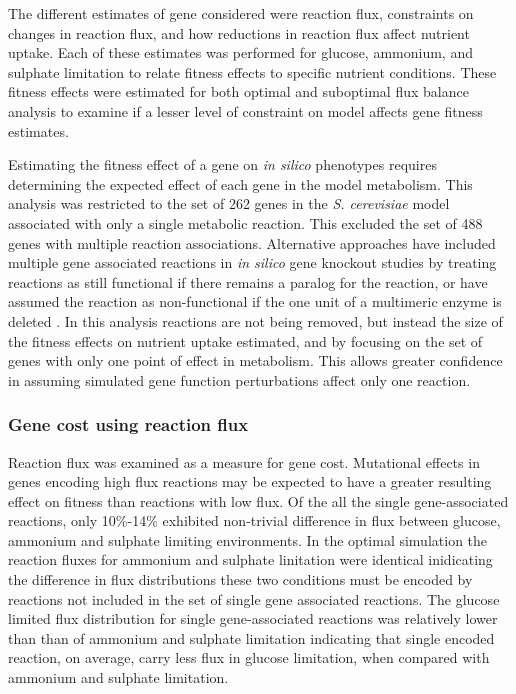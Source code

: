 The different estimates of gene considered were reaction flux, constraints on changes in reaction flux, and how reductions in reaction flux affect nutrient uptake. Each of these estimates was performed for glucose, ammonium, and sulphate limitation to relate fitness effects to specific nutrient conditions. These fitness effects were estimated for both optimal and suboptimal flux balance analysis to examine if a lesser level of constraint on model affects gene fitness estimates.

Estimating the fitness effect of a gene on \emph{in silico} phenotypes requires determining the expected effect of each gene in the model metabolism. This analysis was restricted to the set of 262 genes in the \emph{S. cerevisiae} model associated with only a single metabolic reaction. This excluded the set of 488 genes with multiple reaction associations. Alternative approaches have included multiple gene associated reactions in \emph{in silico} gene knockout studies by treating reactions as still functional if there remains a paralog for the reaction, or have assumed the reaction as non-functional if the one unit of a multimeric enzyme is deleted \cite{pal2006}. In this analysis reactions are not being removed, but instead the size of the fitness effects on nutrient uptake estimated, and by focusing on the set of genes with only one point of effect in metabolism. This allows greater confidence in assuming simulated gene function perturbations affect only one reaction.

\subsubsection{Gene cost using reaction flux}%

Reaction flux was examined as a measure for gene cost. Mutational effects in genes encoding high flux reactions may be expected to have a greater resulting effect on fitness than reactions with low flux. Of the all the single gene-associated reactions, only 10\%-14\% exhibited non-trivial difference in flux between glucose, ammonium and sulphate limiting environments. In the optimal simulation the reaction fluxes for ammonium and sulphate linitation were identical inidicating the difference in flux distributions these two conditions must be encoded by reactions not included in the set of single gene associated reactions. The glucose limited flux distribution for single gene-associated reactions was relatively lower than than of ammonium and sulphate limitation indicating that single encoded reaction, on average, carry less flux in glucose limitation, when compared with ammonium and sulphate limitation.


